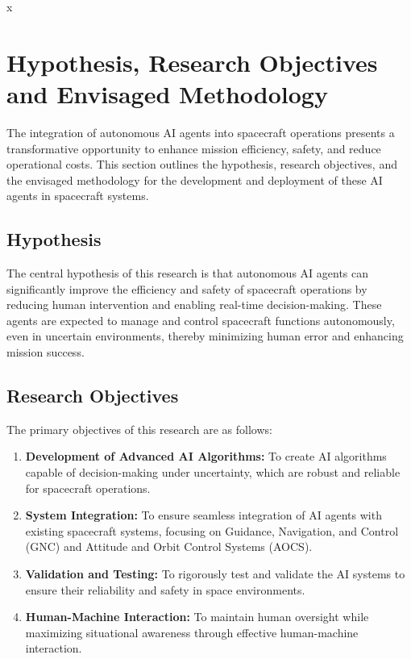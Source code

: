 \documentclass[a4paper,12pt]{article}
\begin{document}
x
\section{Hypothesis, Research Objectives and Envisaged Methodology}

The integration of autonomous AI agents into spacecraft operations presents a transformative opportunity to enhance mission efficiency, safety, and reduce operational costs. This section outlines the hypothesis, research objectives, and the envisaged methodology for the development and deployment of these AI agents in spacecraft systems.

\subsection{Hypothesis}

The central hypothesis of this research is that autonomous AI agents can significantly improve the efficiency and safety of spacecraft operations by reducing human intervention and enabling real-time decision-making. These agents are expected to manage and control spacecraft functions autonomously, even in uncertain environments, thereby minimizing human error and enhancing mission success.

\subsection{Research Objectives}

The primary objectives of this research are as follows:

\begin{enumerate}
    \item \textbf{Development of Advanced AI Algorithms:} To create AI algorithms capable of decision-making under uncertainty, which are robust and reliable for spacecraft operations.
    \item \textbf{System Integration:} To ensure seamless integration of AI agents with existing spacecraft systems, focusing on Guidance, Navigation, and Control (GNC) and Attitude and Orbit Control Systems (AOCS).
    \item \textbf{Validation and Testing:} To rigorously test and validate the AI systems to ensure their reliability and safety in space environments.
    \item \textbf{Human-Machine Interaction:} To maintain human oversight while maximizing situational awareness through effective human-machine interaction.
\end{enumerate}
\end{document}
